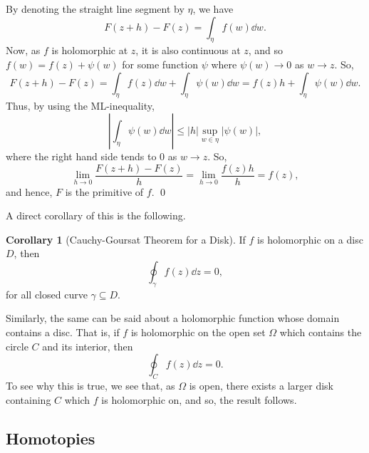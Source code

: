 \documentclass[
]{article}
\theoremstyle{definition}
\newtheorem{corollary}{Corollary}[theorem]
\theoremstyle{definition}
\begin{document}
\begin{center}
\end{center}

By denoting the straight line segment by \(\eta\), we have
\[F(z + h) - F(z) = \int_\eta f(w) \dd w.\] Now, as \(f\) is holomorphic
at \(z\), it is also continuous at \(z\), and so
\(f(w) = f(z) + \psi(w)\) for some function \(\psi\) where
\(\psi(w) \to 0\) as \(w \to z\). So,
\[F(z + h) - F(z) = \int_\eta f(z) \dd w + \int_\eta \psi(w) \dd w = 
  f(z) h + \int_\eta \psi(w) \dd w.\] Thus, by using the ML-inequality,
\[\left| \int_\eta \psi(w) \dd w \right| \le |h| \sup_{w \in \eta} |\psi(w)|,\]
where the right hand side tends to \(0\) as \(w \to z\). So,
\[\lim_{h \to 0} \frac{F(z + h) - F(z)}{h} = \lim_{h \to 0}\frac{f(z)h}{h} = f(z),\]
and hence, \(F\) is the primitive of \(f\). \qed

A direct corollary of this is the following.

\begin{corollary}[Cauchy-Goursat Theorem for a Disk]
  If \(f\) is holomorphic on a disc \(D\), then 
  \[\oint_\gamma f(z) \dd z = 0,\]
  for all closed curve \(\gamma \subseteq D\).
\end{corollary}

Similarly, the same can be said about a holomorphic function whose
domain contains a disc. That is, if \(f\) is holomorphic on the open set
\(\Omega\) which contains the circle \(C\) and its interior, then
\[\oint_C f(z) \dd z = 0.\] To see why this is true, we see that, as
\(\Omega\) is open, there exists a larger disk containing \(C\) which
\(f\) is holomorphic on, and so, the result follows.

\hypertarget{homotopies}{%
\subsection{Homotopies}\label{homotopies}}
\end{document}

